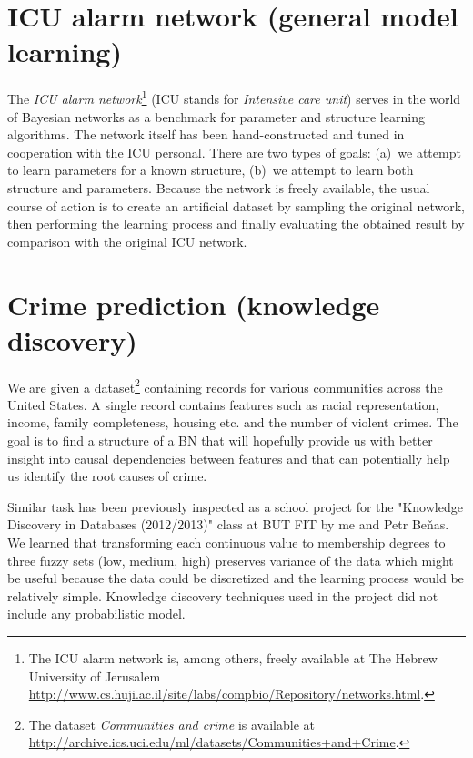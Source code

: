\documentclass[english,cover]{fitthesis} %
\newcommand{\term}[1]{\emph{#1}}           %
\newcommand{\ignore}[1]{}                  %
\begin{document}
\section{ICU alarm network (general model learning)}
The \term{ICU alarm network}\footnote{The ICU alarm network is, among others, freely available at The Hebrew University of Jerusalem \ignore{\url{http://www.bnlearn.com/bnrepository/}}\url{http://www.cs.huji.ac.il/site/labs/compbio/Repository/networks.html}.} (ICU stands for \term{Intensive care unit}) serves in the world of Bayesian networks as a benchmark for parameter and structure learning algorithms. The network itself has been hand-constructed and tuned in cooperation with the ICU personal. There are two types of goals: (a)~we attempt to learn parameters for a known structure, (b)~we attempt to learn both structure and parameters. Because the network is freely available, the usual course of action is to create an artificial dataset by sampling the original network, then performing the learning process and finally evaluating the obtained result by comparison with the original ICU network. 


\section{Crime prediction (knowledge discovery)}
We are given a dataset\footnote{The dataset \emph{Communities and crime} is available at \url{http://archive.ics.uci.edu/ml/datasets/Communities+and+Crime}.} containing records for various communities across the United States. A single record contains features such as racial representation, income, family completeness, housing etc. and the number of violent crimes. The goal is to find a structure of a BN that will hopefully provide us with better insight into causal dependencies between features and that can potentially help us identify the root causes of crime.

Similar task has been previously inspected as a school project for the "Knowledge Discovery in Databases (2012/2013)" class at BUT FIT by me and Petr Beňas. We learned that transforming each continuous value to membership degrees to three fuzzy sets (low, medium, high) preserves variance of the data which might be useful because the data could be discretized and the learning process would be relatively simple. Knowledge discovery techniques used in the project did not include any probabilistic model.
\end{document}

